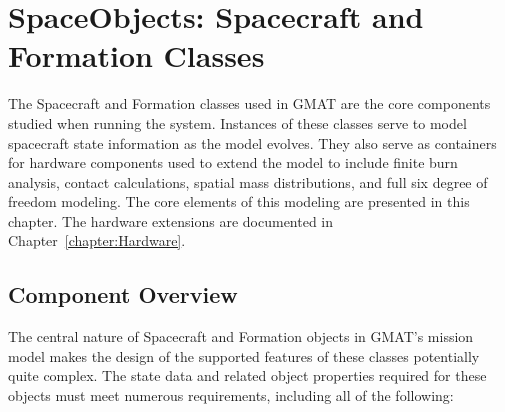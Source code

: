 \chapter{\label{chapter:Spacecraft}SpaceObjects: Spacecraft and Formation Classes}

The Spacecraft and Formation classes used in GMAT are the core components studied when running the
system. Instances of these classes serve to model spacecraft state information as the model
evolves.  They also serve as containers for hardware components used to extend the model to include
finite burn analysis, contact calculations, spatial mass distributions, and full six degree of
freedom modeling.  The core elements of this modeling are presented in this chapter.  The hardware
extensions are documented in Chapter~\ref{chapter:Hardware}.

\section{Component Overview}

The central nature of Spacecraft and Formation objects in GMAT's mission model makes the design of
the supported features of these classes potentially quite complex.  The state data and related
object properties required for these objects must meet numerous requirements, including all of the
following:

